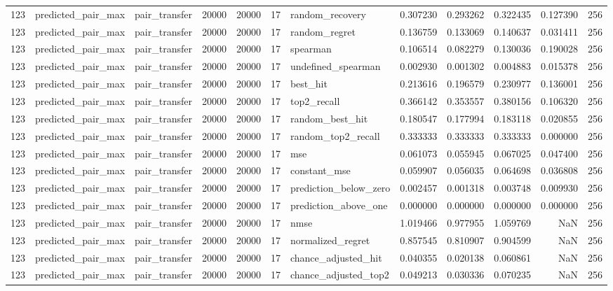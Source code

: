 \begin{tabular}{rllrrrlrrrrr}
123 & predicted_pair_max & pair_transfer & 20000 & 20000 & 17 & random_recovery & 0.307230 & 0.293262 & 0.322435 & 0.127390 & 256 \\
123 & predicted_pair_max & pair_transfer & 20000 & 20000 & 17 & random_regret & 0.136759 & 0.133069 & 0.140637 & 0.031411 & 256 \\
123 & predicted_pair_max & pair_transfer & 20000 & 20000 & 17 & spearman & 0.106514 & 0.082279 & 0.130036 & 0.190028 & 256 \\
123 & predicted_pair_max & pair_transfer & 20000 & 20000 & 17 & undefined_spearman & 0.002930 & 0.001302 & 0.004883 & 0.015378 & 256 \\
123 & predicted_pair_max & pair_transfer & 20000 & 20000 & 17 & best_hit & 0.213616 & 0.196579 & 0.230977 & 0.136001 & 256 \\
123 & predicted_pair_max & pair_transfer & 20000 & 20000 & 17 & top2_recall & 0.366142 & 0.353557 & 0.380156 & 0.106320 & 256 \\
123 & predicted_pair_max & pair_transfer & 20000 & 20000 & 17 & random_best_hit & 0.180547 & 0.177994 & 0.183118 & 0.020855 & 256 \\
123 & predicted_pair_max & pair_transfer & 20000 & 20000 & 17 & random_top2_recall & 0.333333 & 0.333333 & 0.333333 & 0.000000 & 256 \\
123 & predicted_pair_max & pair_transfer & 20000 & 20000 & 17 & mse & 0.061073 & 0.055945 & 0.067025 & 0.047400 & 256 \\
123 & predicted_pair_max & pair_transfer & 20000 & 20000 & 17 & constant_mse & 0.059907 & 0.056035 & 0.064698 & 0.036808 & 256 \\
123 & predicted_pair_max & pair_transfer & 20000 & 20000 & 17 & prediction_below_zero & 0.002457 & 0.001318 & 0.003748 & 0.009930 & 256 \\
123 & predicted_pair_max & pair_transfer & 20000 & 20000 & 17 & prediction_above_one & 0.000000 & 0.000000 & 0.000000 & 0.000000 & 256 \\
123 & predicted_pair_max & pair_transfer & 20000 & 20000 & 17 & nmse & 1.019466 & 0.977955 & 1.059769 & NaN & 256 \\
123 & predicted_pair_max & pair_transfer & 20000 & 20000 & 17 & normalized_regret & 0.857545 & 0.810907 & 0.904599 & NaN & 256 \\
123 & predicted_pair_max & pair_transfer & 20000 & 20000 & 17 & chance_adjusted_hit & 0.040355 & 0.020138 & 0.060861 & NaN & 256 \\
123 & predicted_pair_max & pair_transfer & 20000 & 20000 & 17 & chance_adjusted_top2 & 0.049213 & 0.030336 & 0.070235 & NaN & 256 \\

\end{tabular}
